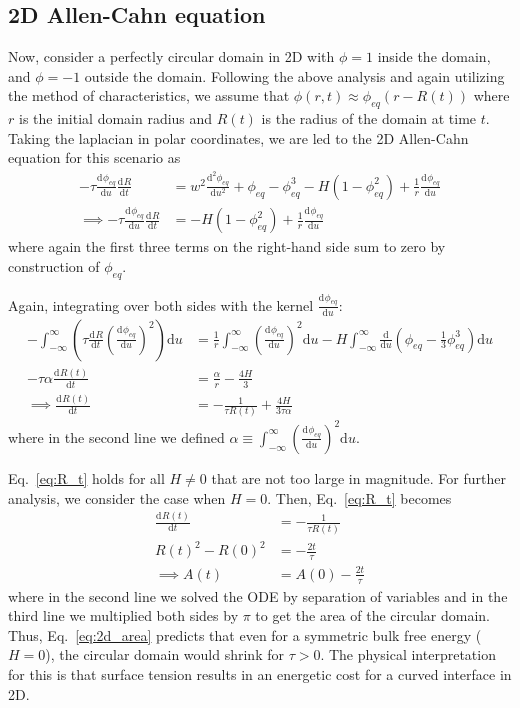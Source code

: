 \documentclass[12pt]{article}
\newcommand{\refeq}[1]{Eq.~\eqref{#1}}
\newcommand{\diff}{\mathrm{d}}
\providecommand*{\deriv}[3][]{\frac{\diff^{#1}#2}{\diff #3^{#1}}}
\begin{document}
\subsection{2D Allen-Cahn equation}\label{sec:2D_ac}
Now, consider a perfectly circular domain in 2D with $\phi=1$ inside the domain, and $\phi = -1$ outside the domain.
Following the above analysis and again utilizing the method of characteristics, we assume that $\phi(r,t) \approx \phi_{eq}(r-R(t))$ where $r$ is the initial domain radius and $R(t)$ is the radius of the domain at time $t$.
Taking the laplacian in polar coordinates, we are led to the 2D Allen-Cahn equation for this scenario as
\begin{align}
    -\tau \deriv{\phi_{eq}}{u}\deriv{R}{t} &= w^2 \deriv[2]{\phi_{eq}}{u} + \phi_{eq} -\phi_{eq}^3 - H \left(1-\phi_{eq}^2\right) + \frac{1}{r}\deriv{\phi_{eq}}{u} \nonumber \\
    \implies -\tau \deriv{\phi_{eq}}{u}\deriv{R}{t} &=  - H \left(1-\phi_{eq}^2\right) + \frac{1}{r}\deriv{\phi_{eq}}{u} \label{eq:2d_ac}
\end{align}
where again the first three terms on the right-hand side sum to zero by construction of $\phi_{eq}$.

Again, integrating over both sides with the kernel $\deriv[]{\phi_{eq}}{u}$:
\begin{align}
    -\int_{-\infty}^{\infty}\left(\tau \deriv[]{R}{t} \left(\deriv[]{\phi_{eq}}{u}\right)^2\right)\diff u &= \frac{1}{r} \int_{-\infty}^{\infty}\left(\deriv{\phi_{eq}}{u}\right)^2 \diff u - H \int_{-\infty}^{\infty} \frac{\diff}{\diff u} \left(\phi_{eq} - \frac{1}{3}\phi_{eq}^3\right)\diff u \nonumber \\
    -\tau \alpha \deriv[]{R(t)}{t} &= \frac{\alpha}{r} - \frac{4H}{3} \nonumber \\
    \implies \deriv[]{R(t)}{t} &= -\frac{1}{\tau R(t)} + \frac{4H}{3\tau\alpha} \label{eq:R_t}
\end{align}
where in the second line we defined $\alpha \equiv \int_{-\infty}^{\infty}\left(\deriv{\phi_{eq}}{u}\right)^2 \diff u$.

\refeq{eq:R_t} holds for all $H\neq 0$ that are not too large in magnitude.
For further analysis, we consider the case when $H=0$.
Then, \refeq{eq:R_t} becomes
\begin{align}
    \deriv[]{R(t)}{t} &= -\frac{1}{\tau R(t)} \nonumber \\
    R(t)^2 - R(0)^2 &= -\frac{2t}{\tau} \nonumber \\
    \implies A(t) &= A(0) - \frac{2t}{\tau} \label{eq:2d_area}
\end{align}
where in the second line we solved the ODE by separation of variables and in the third line we multiplied both sides by $\pi$ to get the area of the circular domain.
Thus, \refeq{eq:2d_area} predicts that even for a symmetric bulk free energy ($H=0$), the circular domain would shrink for $\tau>0$.
The physical interpretation for this is that surface tension results in an energetic cost for a curved interface in 2D.
\end{document}
